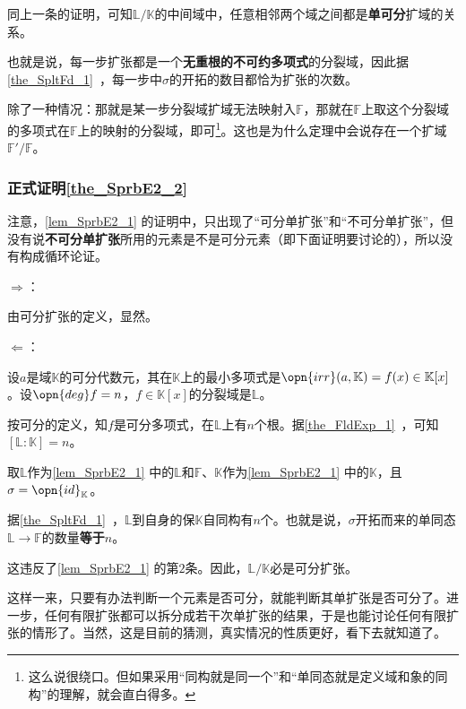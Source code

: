 同上一条的证明，可知$\mathbb{L}/\mathbb{K}$的中间域中，任意相邻两个域之间都是\textbf{单可分}扩域的关系。

也就是说，每一步扩张都是一个\textbf{无重根的不可约多项式}的分裂域，因此据\autoref{the_SpltFd_1}~，每一步中$\sigma$的开拓的数目都恰为扩张的次数。

除了一种情况：那就是某一步分裂域扩域无法映射入$\mathbb{F}$，那就在$\mathbb{F}$上取这个分裂域的多项式在$\mathbb{F}$上的映射的分裂域，即可\footnote{这么说很绕口。但如果采用“同构就是同一个”和“单同态就是定义域和象的同构”的理解，就会直白得多。}。这也是为什么定理中会说存在一个扩域$\mathbb{F}'/\mathbb{F}$。




\subsubsection{正式证明\autoref{the_SprbE2_2} }

注意，\autoref{lem_SprbE2_1} 的证明中，只出现了“可分单扩张”和“不可分单扩张”，但没有说\textbf{不可分单扩张}所用的元素是不是可分元素（即下面证明要讨论的），所以没有构成循环论证。

$\Rightarrow$：

由可分扩张的定义，显然。

$\Leftarrow$：

设$a$是域$\mathbb{K}$的可分代数元，其在$\mathbb{K}$上的最小多项式是$\opn{irr}(a, \mathbb{K})=f(x)\in\mathbb{K}[x]$。设$\opn{deg}f=n$，$f\in\mathbb{K}[x]$的分裂域是$\mathbb{L}$。

按可分的定义，知$f$是可分多项式，在$\mathbb{L}$上有$n$个根。据\autoref{the_FldExp_1}~，可知$[\mathbb{L}:\mathbb{K}]=n$。

取$\mathbb{L}$作为\autoref{lem_SprbE2_1} 中的$\mathbb{L}$和$\mathbb{F}$、$\mathbb{K}$作为\autoref{lem_SprbE2_1} 中的$\mathbb{K}$，且$\sigma=\opn{id}_{\mathbb{K}}$。

据\autoref{the_SpltFd_1}~，$\mathbb{L}$到自身的保$\mathbb{K}$自同构有$n$个。也就是说，$\sigma$开拓而来的单同态$\mathbb{L}\to\mathbb{F}$的数量\textbf{等于}$n$。

这违反了\autoref{lem_SprbE2_1} 的第$2$条。因此，$\mathbb{L}/\mathbb{K}$必是可分扩张。



这样一来，只要有办法判断一个元素是否可分，就能判断其单扩张是否可分了。进一步，任何有限扩张都可以拆分成若干次单扩张的结果，于是也能讨论任何有限扩张的情形了。当然，这是目前的猜测，真实情况的性质更好，看下去就知道了。



